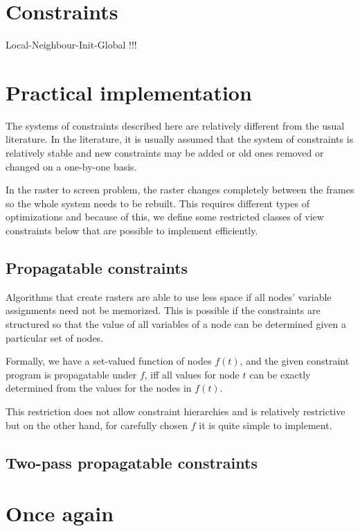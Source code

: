 \documentclass[a4paper]{article}
\begin{document}
\section{Constraints}

Local-Neighbour-Init-Global !!!


\section{Practical implementation}

The systems of constraints described here are relatively 
different from the usual literature. In the literature,
it is usually assumed that the system of constraints is relatively
stable and new constraints may be added or old ones removed or changed
on a one-by-one basis.

In the raster to screen problem, the raster changes completely between
the frames so the whole system needs to be rebuilt. This requires different
types of optimizations and because of this, we define some restricted
classes of view constraints below that are possible to implement efficiently.

\subsection{Propagatable constraints}

Algorithms that create rasters are able to use less space if 
all nodes' variable assignments need not be memorized.
This is possible if the constraints are structured  so that 
the value of all variables of a node can be determined given
a particular set of nodes.

Formally, we have a set-valued function of nodes $f(t)$, and 
the given constraint program is propagatable under $f$, iff
all values for node $t$ can be exactly determined from 
the values for the nodes in $f(t)$.

This restriction does not allow constraint hierarchies and is
relatively restrictive but on the other hand, for carefully
chosen $f$ it is quite simple to implement.



\subsection{Two-pass propagatable constraints}


\section{Once again}
\end{document}
